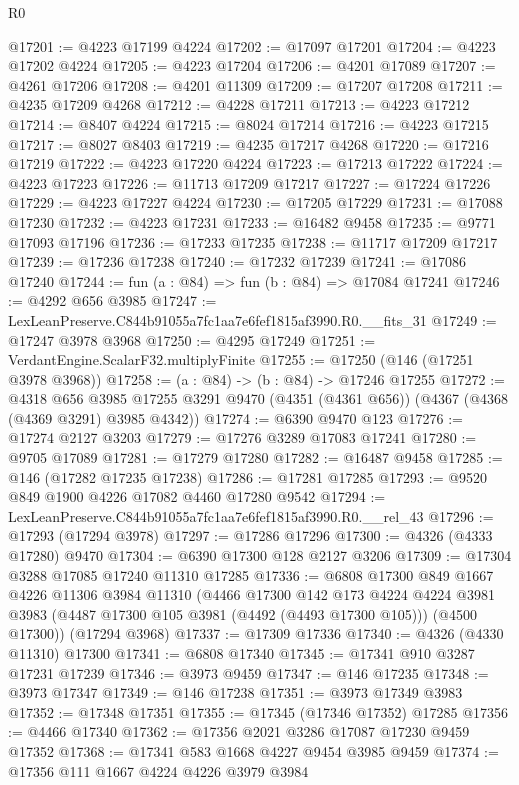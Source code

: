 \begin{lexlean}{R0}
\begin{coremodule}
@17201 := @4223 @17199 @4224
@17202 := @17097 @17201
@17204 := @4223 @17202 @4224
@17205 := @4223 @17204
@17206 := @4201 @17089
@17207 := @4261 @17206
@17208 := @4201 @11309
@17209 := @17207 @17208
@17211 := @4235 @17209 @4268
@17212 := @4228 @17211
@17213 := @4223 @17212
@17214 := @8407 @4224
@17215 := @8024 @17214
@17216 := @4223 @17215
@17217 := @8027 @8403
@17219 := @4235 @17217 @4268
@17220 := @17216 @17219
@17222 := @4223 @17220 @4224
@17223 := @17213 @17222
@17224 := @4223 @17223
@17226 := @11713 @17209 @17217
@17227 := @17224 @17226
@17229 := @4223 @17227 @4224
@17230 := @17205 @17229
@17231 := @17088 @17230
@17232 := @4223 @17231
@17233 := @16482 @9458
@17235 := @9771 @17093 @17196
@17236 := @17233 @17235
@17238 := @11717 @17209 @17217
@17239 := @17236 @17238
@17240 := @17232 @17239
@17241 := @17086 @17240
@17244 := fun (a : @84) => fun (b : @84) => @17084 @17241
@17246 := @4292 @656 @3985
@17247 := LexLeanPreserve.C844b91055a7fc1aa7e6fef1815af3990.R0.__fits_31
@17249 := @17247 @3978 @3968
@17250 := @4295 @17249
@17251 := VerdantEngine.ScalarF32.multiplyFinite
@17255 := @17250 (@146 (@17251 @3978 @3968))
@17258 := (a : @84) -> (b : @84) -> @17246 @17255
@17272 := @4318
    @656
    @3985
    @17255
    @3291
    @9470
    (@4351 (@4361 @656))
    (@4367 (@4368 (@4369 @3291) @3985 @4342))
@17274 := @6390 @9470 @123
@17276 := @17274 @2127 @3203
@17279 := @17276 @3289 @17083 @17241
@17280 := @9705 @17089
@17281 := @17279 @17280
@17282 := @16487 @9458
@17285 := @146 (@17282 @17235 @17238)
@17286 := @17281 @17285
@17293 := @9520 @849 @1900 @4226 @17082 @4460 @17280 @9542
@17294 := LexLeanPreserve.C844b91055a7fc1aa7e6fef1815af3990.R0.__rel_43
@17296 := @17293 (@17294 @3978)
@17297 := @17286 @17296
@17300 := @4326 (@4333 @17280) @9470
@17304 := @6390 @17300 @128 @2127 @3206
@17309 := @17304 @3288 @17085 @17240 @11310 @17285
@17336 := @6808
    @17300
    @849
    @1667
    @4226
    @11306
    @3984
    @11310
    (@4466
      @17300
      @142
      @173
      @4224
      @4224
      @3981
      @3983
      (@4487 @17300 @105 @3981 (@4492 (@4493 @17300 @105)))
      (@4500 @17300))
    (@17294 @3968)
@17337 := @17309 @17336
@17340 := @4326 (@4330 @11310) @17300
@17341 := @6808 @17340
@17345 := @17341 @910 @3287 @17231 @17239
@17346 := @3973 @9459
@17347 := @146 @17235
@17348 := @3973 @17347
@17349 := @146 @17238
@17351 := @3973 @17349 @3983
@17352 := @17348 @17351
@17355 := @17345 (@17346 @17352) @17285
@17356 := @4466 @17340
@17362 := @17356 @2021 @3286 @17087 @17230 @9459 @17352
@17368 := @17341 @583 @1668 @4227 @9454 @3985 @9459
@17374 := @17356 @111 @1667 @4224 @4226 @3979 @3984

\end{coremodule}
\end{lexlean}
